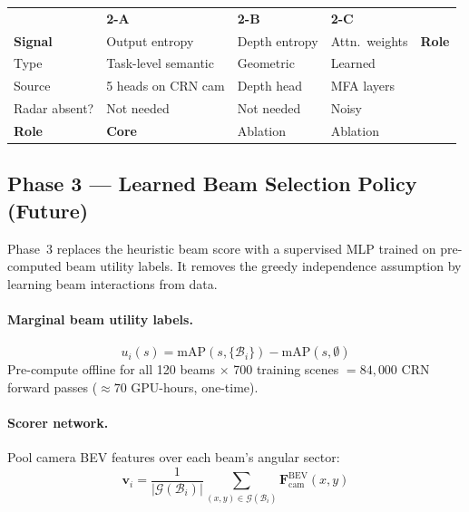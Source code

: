 \documentclass[12pt, a4paper]{article}
\newcommand{\beam}{\mathcal{B}}
\newcommand{\bev}{\mathrm{BEV}}
\newcommand{\Fbev}{\mathbf{F}^{\bev}}
\theoremstyle{definition}
\begin{document}
\begin{center}
\renewcommand{\arraystretch}{1.3}
\begin{tabular}{lllll}
  \toprule
  & \textbf{2-A} & \textbf{2-B} & \textbf{2-C} & \\
  \textbf{Signal} & Output entropy & Depth entropy & Attn.\ weights
    & \textbf{Role} \\
  \midrule
  Type & Task-level semantic & Geometric & Learned & \\
  Source & 5 heads on CRN cam & Depth head & MFA layers & \\
  Radar absent? & Not needed & Not needed & Noisy & \\
  \textbf{Role} & \textcolor{corered}{\textbf{Core}} &
    \textcolor{plannedpurple}{Ablation} &
    \textcolor{plannedpurple}{Ablation} & \\
  \bottomrule
\end{tabular}
\end{center}

\subsection{Phase 3 --- Learned Beam Selection Policy (Future)}
\label{sec:phase3}

\begin{futurebox}
  Phase~3 replaces the heuristic beam score with a supervised MLP trained
  on pre-computed beam utility labels. It removes the greedy independence
  assumption by learning beam interactions from data.
\end{futurebox}

\paragraph{Marginal beam utility labels.}
\begin{equation}
  u_i(s)
  = \mathrm{mAP}(s,\{\beam_i\}) - \mathrm{mAP}(s,\emptyset)
  \label{eq:marginal_utility}
\end{equation}
Pre-compute offline for all 120 beams $\times$ 700 training scenes
$= 84{,}000$ CRN forward passes ($\approx 70$ GPU-hours, one-time).

\paragraph{Scorer network.}
Pool camera BEV features over each beam's angular sector:
\begin{equation}
  \mathbf{v}_i = \frac{1}{|\mathcal{G}(\beam_i)|}
    \sum_{(x,y)\in\mathcal{G}(\beam_i)}\Fbev_\mathrm{cam}(x,y)
  \label{eq:beam_pool_feat}
\end{equation}
\end{document}
